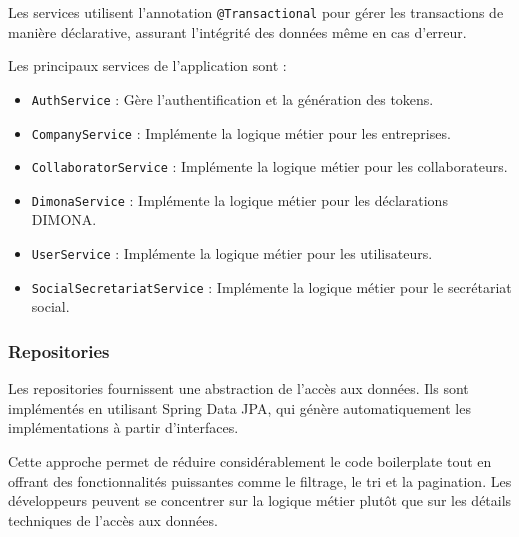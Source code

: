 \vspace{0.5cm}

\begin{note}
Les services utilisent l'annotation \texttt{@Transactional} pour gérer les transactions de manière déclarative, assurant l'intégrité des données même en cas d'erreur.
\end{note}

\newpage

\noindent Les principaux services de l'application sont :
\begin{itemize}[leftmargin=*,label=\textcolor{darkgray}{$\bullet$},itemsep=0.3em]
  \item \texttt{AuthService} : Gère l'authentification et la génération des tokens.
  \item \texttt{CompanyService} : Implémente la logique métier pour les entreprises.
  \item \texttt{CollaboratorService} : Implémente la logique métier pour les collaborateurs.
  \item \texttt{DimonaService} : Implémente la logique métier pour les déclarations DIMONA.
  \item \texttt{UserService} : Implémente la logique métier pour les utilisateurs.
  \item \texttt{SocialSecretariatService} : Implémente la logique métier pour le secrétariat social.
\end{itemize}

\subsubsection{Repositories}

Les repositories fournissent une abstraction de l'accès aux données. Ils sont implémentés en utilisant Spring Data JPA, qui génère automatiquement les implémentations à partir d'interfaces.

\vspace{0.5cm}

\begin{tcolorbox}[
  title={\textbf{Avantages des repositories Spring Data}},
  colback=blue!5!white,
  colframe=primarycolor,
  fonttitle=\bfseries,
  boxrule=0.5mm,
  arc=2mm,
  left=6mm,
  right=6mm,
  top=6mm,
  bottom=6mm
]
Cette approche permet de réduire considérablement le code boilerplate tout en offrant des fonctionnalités puissantes comme le filtrage, le tri et la pagination. Les développeurs peuvent se concentrer sur la logique métier plutôt que sur les détails techniques de l'accès aux données.
\end{tcolorbox}

